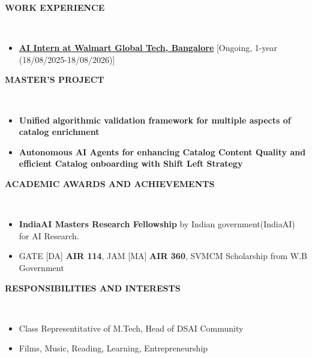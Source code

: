 \documentclass[a4paper,10pt]{article}
\newcommand{\lsep}{-0.5cm}
\newcommand{\resheading}[1]{{\small \colorbox{mygrey}{\begin{minipage}{0.975\textwidth}{\textbf{#1 \vphantom{p\^{E}}}}\end{minipage}}}}
\begin{document}
\resheading{\textbf{WORK EXPERIENCE} }\\[\lsep]
\begin{itemize}
\item \href{https://github.com/soumitrapy/resume/blob/main/docs/IDC%20-%20Intern%20Offer%20Letter%202025-08-11.pdf}{\textbf{AI Intern at Walmart Global Tech, Bangalore}} [Ongoing, 1-year (18/08/2025-18/08/2026)]
\end{itemize}

\resheading{\textbf{MASTER'S PROJECT} }\\[\lsep]
\begin{itemize}
\setlength\itemsep{0.1em}
\item \textbf{Unified algorithmic validation framework for multiple aspects of catalog enrichment}
\item \textbf{Autonomous AI Agents for enhancing Catalog Content Quality and efficient Catalog onboarding with Shift Left Strategy}
\end{itemize}

\resheading{\textbf{ACADEMIC AWARDS AND ACHIEVEMENTS} }\\[\lsep]
\begin{itemize}
\item \textbf{IndiaAI Masters Research Fellowship} by Indian government(IndiaAI) for AI Research.
\item GATE [DA] \textbf{AIR 114}, JAM [MA] \textbf{AIR 360}, SVMCM Scholarship from W.B Government
\end{itemize}

\resheading{\textbf{RESPONSIBILITIES AND INTERESTS} }\\[\lsep]
\begin{itemize}
\item Class Representitative of M.Tech, Head of DSAI Community
\item Films, Music, Reading, Learning, Entrepreneurship
\end{itemize}
\end{document}
